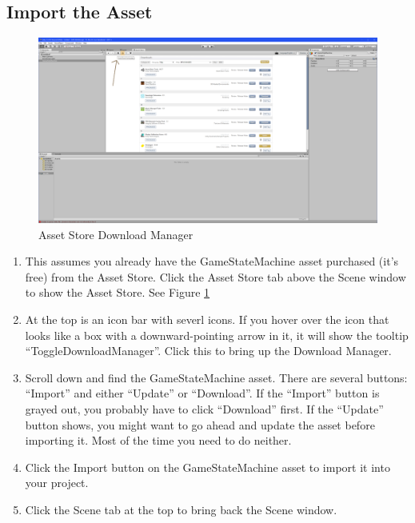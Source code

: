 \documentclass[letter,12pt]{article}
\begin{document}
\subsection{Import the Asset}

\begin{figure}
 \includegraphics[width=6in]{asset.png}
 \caption{Asset Store Download Manager}
 \label{fig:asset}
\end{figure}

\begin{enumerate}

\item This assumes you already have the GameStateMachine asset purchased (it’s free) from the Asset Store.  Click the Asset Store tab above the Scene window to show the Asset Store.  See Figure \ref{fig:asset}

\item At the top is an icon bar with severl icons.  If you hover over the icon that looks like a box with a downward-pointing arrow in it, it will show the tooltip “ToggleDownloadManager”.  Click this to bring up the Download Manager.  

\item Scroll down and find the GameStateMachine asset.  There are several buttons: “Import” and either “Update” or “Download”.  If the “Import” button is grayed out, you probably have to click “Download” first.  If the “Update” button shows, you might want to go ahead and update the asset before importing it.  Most of the time you need to do neither.

\item Click the Import button on the GameStateMachine asset to import it into your project.

\item Click the Scene tab at the top to bring back the Scene window.
 
\end{enumerate}
\end{document}
